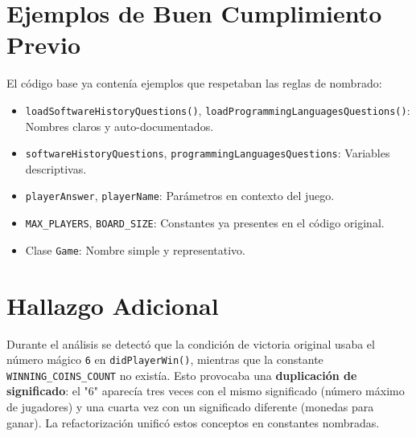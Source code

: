\section{Ejemplos de Buen Cumplimiento Previo}

El código base ya contenía ejemplos que respetaban las reglas de nombrado:

\begin{itemize}
    \item \texttt{loadSoftwareHistoryQuestions()}, \texttt{loadProgrammingLanguagesQuestions()}: Nombres claros y auto-documentados.
    \item \texttt{softwareHistoryQuestions}, \texttt{programmingLanguagesQuestions}: Variables descriptivas.
    \item \texttt{playerAnswer}, \texttt{playerName}: Parámetros en contexto del juego.
    \item \texttt{MAX\_PLAYERS}, \texttt{BOARD\_SIZE}: Constantes ya presentes en el código original.
    \item Clase \texttt{Game}: Nombre simple y representativo.
\end{itemize}

\section{Hallazgo Adicional}

Durante el análisis se detectó que la condición de victoria original usaba el número mágico \texttt{6} en \texttt{didPlayerWin()}, mientras que la constante \texttt{WINNING\_COINS\_COUNT} no existía. Esto provocaba una \textbf{duplicación de significado}: el "6" aparecía tres veces con el mismo significado (número máximo de jugadores) y una cuarta vez con un significado diferente (monedas para ganar). La refactorización unificó estos conceptos en constantes nombradas.